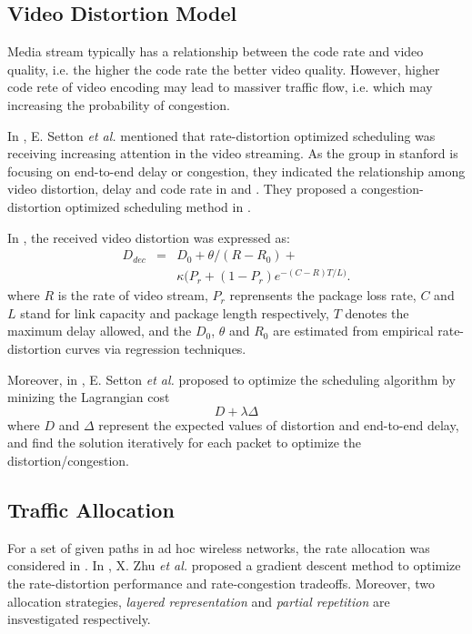 \documentclass{IEEEtran}
\begin{document}
\subsection{Video Distortion Model}
\pubidadjcol
Media stream typically has a relationship between the code rate and video quality, i.e. the higher the code rate the better video quality. However, higher code rete of video encoding may lead to massiver traffic flow, i.e. which may increasing the probability of congestion.

In \cite{bib:setton_mmsp2004}, E. Setton \textit{et al.} mentioned that rate-distortion optimized scheduling was receiving increasing attention in the video streaming. As the group \cite{bib:crosslayer} in stanford is focusing on end-to-end delay or congestion, they indicated the relationship among video distortion, delay and code rate in \cite{bib:setton_icme2004} and \cite{bib:setton_mmsp2004}. They proposed a congestion-distortion optimized scheduling method in \cite{bib:setton_mmsp2004}.

In \cite{bib:setton_icme2004}, the received video distortion was expressed as:
\begin{eqnarray}
	D_{dec} & = & D_0+ \theta/(R-R_0)+ \nonumber \\
	&	& \kappa(P_r+(1-P_r)e^{-(C-R)T/L)}.
	\label{equ:distort}
\end{eqnarray}
where $R$ is the rate of video stream, $P_r$ reprensents the package loss rate, $C$ and $L$ stand for link capacity and package length respectively, $T$ denotes the maximum delay allowed, and the $D_0$, $\theta$ and $R_0$ are estimated from empirical rate-distortion curves via regression techniques.

Moreover, in \cite{bib:setton_mmsp2004}, E. Setton \textsl{et al.} proposed to optimize the scheduling algorithm by minizing the Lagrangian cost
\begin{equation}
	D + \lambda\Delta
	\label{equ:codio}
\end{equation}
where $D$ and $\Delta$ represent the expected values of distortion and end-to-end delay, and find the solution iteratively for each packet to optimize the distortion/congestion.

\subsection{Traffic Allocation}
For a set of given paths in ad hoc wireless networks, the rate allocation was considered in \cite{bib:zhu_icip2004}. In \cite{bib:zhu_icip2004}, X. Zhu \textit{et al.} proposed a gradient descent method to optimize the rate-distortion performance and rate-congestion tradeoffs. Moreover, two allocation strategies, \emph{layered representation} and \emph{partial repetition} are insvestigated respectively.
\end{document}

